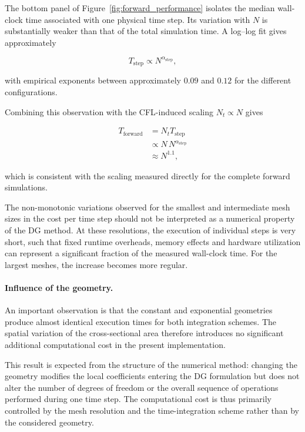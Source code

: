 \documentclass[11pt,a4paper]{report}
\theoremstyle{plain}
\theoremstyle{definition}
\begin{document}
The bottom panel of Figure~\ref{fig:forward_performance} isolates the median
wall-clock time associated with one physical time step. Its variation with
$N$ is substantially weaker than that of the total simulation time. A
log--log fit gives approximately

\begin{equation}
    T_{\mathrm{step}}
    \propto N^{\alpha_{\mathrm{step}}},
\end{equation}

with empirical exponents between approximately $0.09$ and $0.12$ for the
different configurations.

Combining this observation with the CFL-induced scaling
$N_t\propto N$ gives

\begin{equation}
\begin{aligned}
T_{\mathrm{forward}}
&=
N_t T_{\mathrm{step}}
\\
&\propto
N\,N^{\alpha_{\mathrm{step}}}
\\
&\approx
N^{1.1},
\end{aligned}
\end{equation}

which is consistent with the scaling measured directly for the complete
forward simulations.

The non-monotonic variations observed for the smallest and intermediate mesh
sizes in the cost per time step should not be interpreted as a numerical
property of the DG method. At these resolutions, the execution of individual
steps is very short, such that fixed runtime overheads, memory effects and
hardware utilization can represent a significant fraction of the measured
wall-clock time. For the largest meshes, the increase becomes more regular.


\paragraph{Influence of the geometry.}

An important observation is that the constant and exponential geometries
produce almost identical execution times for both integration schemes.
The spatial variation of the cross-sectional area therefore introduces no
significant additional computational cost in the present implementation.

This result is expected from the structure of the numerical method: changing
the geometry modifies the local coefficients entering the DG formulation but
does not alter the number of degrees of freedom or the overall sequence of
operations performed during one time step. The computational cost is thus
primarily controlled by the mesh resolution and the time-integration scheme
rather than by the considered geometry.
\end{document}
